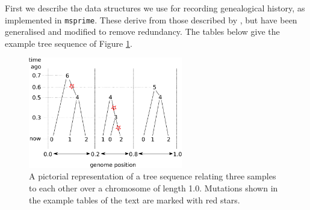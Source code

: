 \documentclass{article}
\newcommand{\msprime}{\texttt{msprime}}
\begin{document}
First we describe the data structures we use for recording genealogical history,
as implemented in \msprime.
These derive from those described by \citet{kelleher2016efficient},
but have been generalised and modified to remove redundancy.
The tables below give the example tree sequence of Figure \ref{fig:ex_tree_seq}.

\begin{figure}
    \begin{center}
        \includegraphics[width=0.6\textwidth]{example_tree_seq}
    \end{center}
    \caption{
        A pictorial representation of a tree sequence
        relating three samples to each other
        over a chromosome of length 1.0.
        Mutations shown in the example tables of the text
        are marked with red stars.
        \label{fig:ex_tree_seq}
    }
\end{figure}
\end{document}
